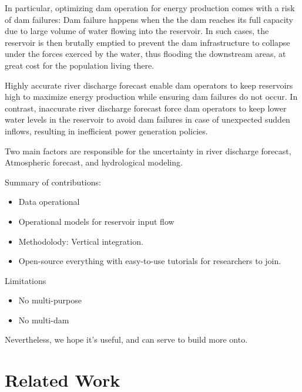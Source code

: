 \documentclass{article}
\begin{document}
In particular, optimizing dam operation for energy production comes with a risk of dam failures:
Dam failure happens when the the dam reaches its full capacity due to large volume 
of water flowing into the reservoir.
In such cases, the reservoir is then brutally emptied to prevent the dam infrastructure to collapse 
under the forces exerced by the water, thus flooding the downstream areas, 
at great cost for the population living there. 

Highly accurate river discharge forecast enable dam operators 
to keep reservoirs high to maximize energy production 
while ensuring dam failures do not occur.
In contrast, inaccurate river discharge forecast force dam operators 
to keep lower water levels in the reservoir to avoid dam failures in case of unexpected sudden inflows,
resulting in inefficient power generation policies.

Two main factors are responsible for the uncertainty in river discharge forecast,
Atmospheric forecast, and hydrological modeling.

% 
% 
%  

Summary of contributions: 




\begin{itemize}
	\item Data operational
	\item Operational models for reservoir input flow
	\item Methodolody: Vertical integration.
	\item Open-source everything with easy-to-use tutorials for researchers to join.
\end{itemize}

Limitations

\begin{itemize}
	\item No multi-purpose
	\item No multi-dam
\end{itemize}

Nevertheless, we hope it's useful, and can serve to build more onto.

\section{Related Work}
\label{sec:Related Work}
\end{document}
